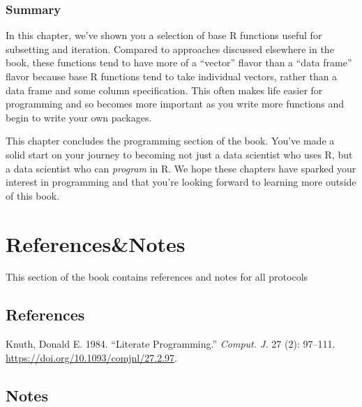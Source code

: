 \documentclass[
  letterpaper,
  DIV=11,
  numbers=noendperiod]{scrreprt}
\newlength{\cslhangindent}
\newlength{\cslentryspacingunit} %
\newenvironment{CSLReferences}[2] %
 {%
  \setlength{\parindent}{0pt}
  \ifodd #1
  \let\oldpar\par
  \def\par{\hangindent=\cslhangindent\oldpar}
  \fi
  \setlength{\parskip}{#2\cslentryspacingunit}
 }%
 {}
\begin{document}
\hypertarget{summary}{%
\section{Summary}\label{summary}}

In this chapter, we've shown you a selection of base R functions useful
for subsetting and iteration. Compared to approaches discussed elsewhere
in the book, these functions tend to have more of a ``vector'' flavor
than a ``data frame'' flavor because base R functions tend to take
individual vectors, rather than a data frame and some column
specification. This often makes life easier for programming and so
becomes more important as you write more functions and begin to write
your own packages.

This chapter concludes the programming section of the book. You've made
a solid start on your journey to becoming not just a data scientist who
uses R, but a data scientist who can \emph{program} in R. We hope these
chapters have sparked your interest in programming and that you're
looking forward to learning more outside of this book.

\part{References\&Notes}

This section of the book contains references and notes for all protocols

\hypertarget{references}{%
\chapter*{References}\label{references}}


\hypertarget{refs}{}
\begin{CSLReferences}{1}{0}
\leavevmode{}%
Knuth, Donald E. 1984. {``Literate Programming.''} \emph{Comput. J.} 27
(2): 97--111. \url{https://doi.org/10.1093/comjnl/27.2.97}.

\end{CSLReferences}

\hypertarget{notes}{%
\chapter*{Notes}\label{notes}}
\end{document}

